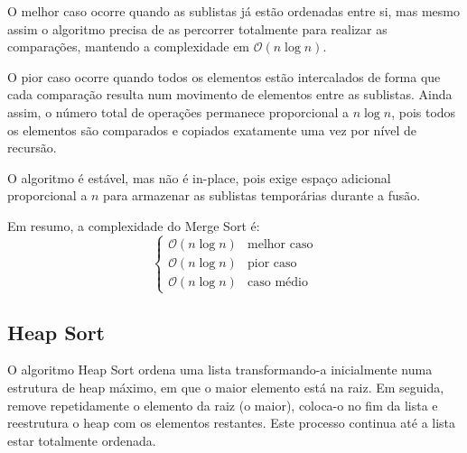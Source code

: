 \documentclass[conference]{IEEEtran}
\begin{document}
O melhor caso ocorre quando as sublistas já estão ordenadas entre si, mas mesmo assim o algoritmo precisa de as percorrer totalmente para realizar as comparações, mantendo a complexidade em \(\mathcal{O}(n \log n)\).

O pior caso ocorre quando todos os elementos estão intercalados de forma que cada comparação resulta num movimento de elementos entre as sublistas. Ainda assim, o número total de operações permanece proporcional a \(n \log n\), pois todos os elementos são comparados e copiados exatamente uma vez por nível de recursão.

O algoritmo é estável, mas não é in-place, pois exige espaço adicional proporcional a \(n\) para armazenar as sublistas temporárias durante a fusão.

Em resumo, a complexidade do Merge Sort é:
\[
\begin{cases}
\mathcal{O}(n \log n) & \text{melhor caso} \\
\mathcal{O}(n \log n) & \text{pior caso} \\
\mathcal{O}(n \log n) & \text{caso médio}
\end{cases}
\]

\subsection{Heap Sort}

O algoritmo Heap Sort ordena uma lista transformando-a inicialmente numa estrutura de heap máximo, em que o maior elemento está na raiz. Em seguida, remove repetidamente o elemento da raiz (o maior), coloca-o no fim da lista e reestrutura o heap com os elementos restantes. Este processo continua até a lista estar totalmente ordenada.
\end{document}
